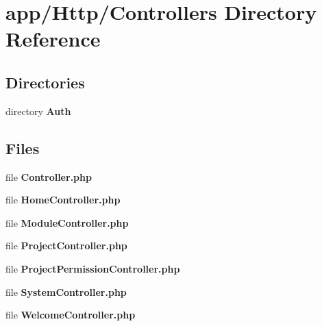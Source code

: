 \section{app/\+Http/\+Controllers Directory Reference}
\label{dir_e0f2ff7a7260cb178251da88c43cf670}
\subsection*{Directories}
\begin{DoxyCompactItemize}
\item 
directory {\bf Auth}
\end{DoxyCompactItemize}
\subsection*{Files}
\begin{DoxyCompactItemize}
\item 
file {\bf Controller.\+php}
\item 
file {\bf Home\+Controller.\+php}
\item 
file {\bf Module\+Controller.\+php}
\item 
file {\bf Project\+Controller.\+php}
\item 
file {\bf Project\+Permission\+Controller.\+php}
\item 
file {\bf System\+Controller.\+php}
\item 
file {\bf Welcome\+Controller.\+php}
\end{DoxyCompactItemize}
